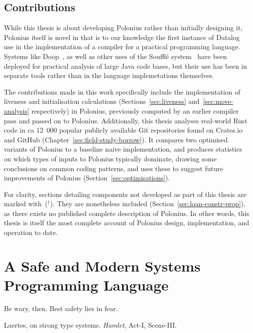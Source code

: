 \documentclass[11pt,a4paper,twoside,openany]{report}
\newcommand{\notmine}[0] {$^\dagger$}
\begin{document}
\section{Contributions}

While this thesis is about developing Polonius rather than initially designing
it, Polonius itself is novel in that is to our knowledge the first instance of
Datalog use in the implementation of a compiler for a practical programming
language. Systems like Doop~\cite{bravenboer_strictly_2009}, as well as other
uses of the Souffl{\'e} system~\cite{souffle} have been deployed for practical
analysis of large Java code bases, but their use has been in separate tools
rather than in the language implemetations themselves.

The contributions made in this work specifically include the implementation of
liveness and initialisation calculations (Sections~\ref{sec:liveness}
and~\ref{sec:move-analysis} respectively) in Polonius, previously computed by an
earlier compiler pass and passed on to Polonius. Additionally, this thesis
analyses real-world Rust code in ca 12~000 popular publicly available Git
repositories found on Crates.io and GitHub
(Chapter~\ref{sec:field-study-borrow}). It compares two optimised variants of
Polonius to a baseline naive implementation, and produces statistics on which
types of inputs to Polonius typically dominate, drawing some conclusions on
common coding patterns, and uses these to suggest future improvements of
Polonius (Section~\ref{sec:optimisations}).

For clarity, sections detailing components not developed as part of this thesis
are marked with~(\notmine{}). They are nonetheless included
(Section~\ref{sec:loan-constr-prop}), as there exists no published complete
description of Polonius. In other words, this thesis is itself the most complete
account of Polonius design, implementation, and operation to date.

\chapter{A Safe and Modern Systems Programming Language}\label{cha:background}
\epigraph{Be wary, then. Best safety lies in fear.}%
{Laertes, on strong type systems. \textit{Hamlet}, Act-I, Scene-III.}

\end{document}
